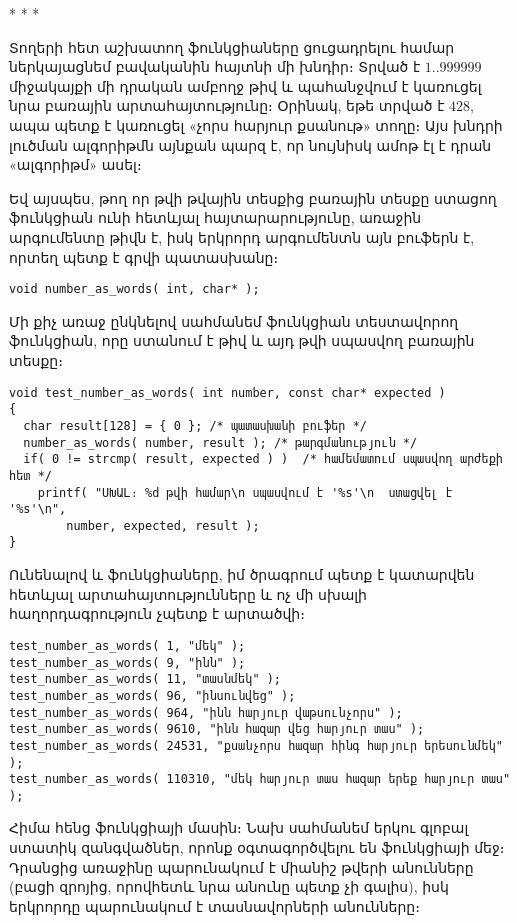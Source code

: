 * * *

Տողերի հետ աշխատող ֆունկցիաները ցուցադրելու համար ներկայացնեմ
բավականին հայտնի մի խնդիր։ Տրված է \(1..999999\) միջակայքի մի
դրական ամբողջ թիվ և պահանջվում է կառուցել նրա բառային
արտահայտությունը։ Օրինակ, եթե տրված է \(428\), ապա պետք է
կառուցել «չորս հարյուր քսանութ» տողը։ Այս խնդրի լուծման ալգորիթմն
այնքան պարզ է, որ նույնիսկ ամոթ էլ է դրան «ալգորիթմ» ասել։

Եվ այսպես, թող որ  թվի թվային տեսքից բառային տեսքը
ստացող ֆունկցիան ունի հետևյալ հայտարարությունը, առաջին արգումենտը
թիվն է, իսկ երկրորդ արգումենտն այն բուֆերն է, որտեղ պետք է
գրվի պատասխանը։

\begin{Verbatim}
void number_as_words( int, char* );
\end{Verbatim}

Մի քիչ առաջ ընկնելով սահմանեմ  ֆունկցիան
տեստավորող  ֆունկցիան, որը ստանում
է թիվ և այդ թվի սպասվող բառային տեսքը։

\begin{Verbatim}
void test_number_as_words( int number, const char* expected )
{
  char result[128] = { 0 }; /* պատասխանի բուֆեր */
  number_as_words( number, result ); /* թարգմանություն */
  if( 0 != strcmp( result, expected ) )  /* համեմատում սպասվող արժեքի հետ */
    printf( "ՍԽԱԼ։ %d թվի համար\n սպասվում է '%s'\n  ստացվել է '%s'\n",
        number, expected, result );
}
\end{Verbatim}

Ունենալով  և 
ֆունկցիաները, իմ ծրագրում պետք է կատարվեն հետևյալ արտահայտությունները
և ոչ մի սխալի հաղորդագրություն չպետք է արտածվի։

\begin{Verbatim}
test_number_as_words( 1, "մեկ" );
test_number_as_words( 9, "ինն" );
test_number_as_words( 11, "տասնմեկ" );
test_number_as_words( 96, "ինսունվեց" );
test_number_as_words( 964, "ինն հարյուր վաթսունչորս" );
test_number_as_words( 9610, "ինն հազար վեց հարյուր տաս" );
test_number_as_words( 24531, "քսանչորս հազար հինգ հարյուր երեսունմեկ" );
test_number_as_words( 110310, "մեկ հարյուր տաս հազար երեք հարյուր տաս" );
\end{Verbatim}

Հիմա հենց  ֆունկցիայի մասին։ Նախ սահմանեմ
երկու գլոբալ ստատիկ զանգվածներ, որոնք օգտագործվելու են ֆունկցիայի
մեջ։ Դրանցից առաջինը պարունակում է միանիշ թվերի անունները (բացի
զրոյից, որովհետև նրա անունը պետք չի գալիս), իսկ երկրորդը պարունակում
է տասնավորների անունները։

